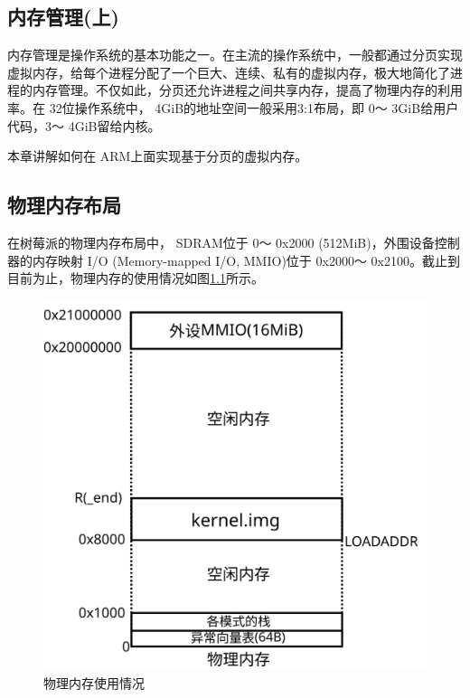 \documentclass[main.tex]{subfiles}
\begin{document}
\ifxetex\else\begin{CJK*}{UTF8}{song}\fi

\chapter{内存管理(上)}
内存管理是操作系统的基本功能之一。在主流的操作系统中，一般都通过分页实现虚拟内存，给每个进程分配了一个巨大、连续、私有的虚拟内存，极大地简化了进程的内存管理。不仅如此，分页还允许进程之间共享内存，提高了物理内存的利用率。在 32位操作系统中， 4\-GiB的地址空间一般采用3:1布局，即 0～ 3\-GiB给用户代码，3～ 4\-GiB留给内核。

\par
本章讲解如何在 ARM上面实现基于分页的虚拟内存。

\section{物理内存布局}
在树莓派的物理内存布局中， SDRAM位于 0～ 0x2000 (512\-MiB)，外围设备控制器的内存映射 I/O (Memory\--\-mapped I/O, MMIO)位于 0x2000～ 0x2100。截止到目前为止，物理内存的使用情况如图\ref{figure:4-1}所示。

\begin{figure}[htp]
\centering
\includegraphics[scale=0.4]{figures/4-1}
\caption{物理内存使用情况}
\label{figure:4-1}
\end{figure}


\end{CJK*}
\end{document}
